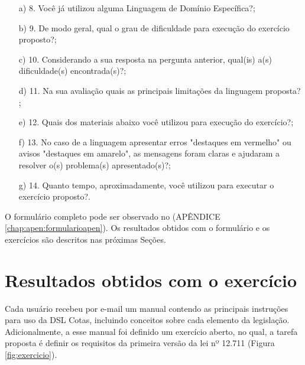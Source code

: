 \begin{enumerate}
    \item[a)] 8. Você já utilizou alguma Linguagem de Domínio Específica?;
    
    \item[b)] 9. De modo geral, qual o grau de dificuldade para execução do exercício proposto?;
    
    \item[c)] 10. Considerando a sua resposta na pergunta anterior, qual(is) a(s) dificuldade(s) encontrada(s)?;
    
    \item[d)] 11. Na sua avaliação quais as principais limitações da linguagem proposta?  ;
    
   \item[e)]  12. Quais dos materiais abaixo você utilizou para execução do exercício?;
   
   \item[f)] 13. No caso de a linguagem apresentar erros "destaques em vermelho" ou avisos "destaques em amarelo", as mensagens foram claras e ajudaram a resolver o(s) problema(s) apresentado(s)?;
   
   \item[g)] 14. Quanto tempo, aproximadamente, você utilizou para executar o exercício proposto?.   

\end{enumerate}

O formulário completo pode ser observado no (APÊNDICE \ref{chap:apen:formularioapen}). Os resultados obtidos com o formulário e os exercícios são descritos nas próximas Seções.


\begin{landscape}

\end{landscape}

\section{Resultados obtidos com o exercício}
\label{sec:analiseexercicio}

Cada usuário recebeu por e-mail um manual  contendo as principais instruções para uso da DSL Cotas, incluindo conceitos sobre cada elemento da legislação. Adicionalmente, a esse manual foi definido um exercício aberto, no qual, a tarefa proposta é definir os requisitos da primeira versão da lei nº 12.711 (Figura \ref{fig:exercicio}). 



